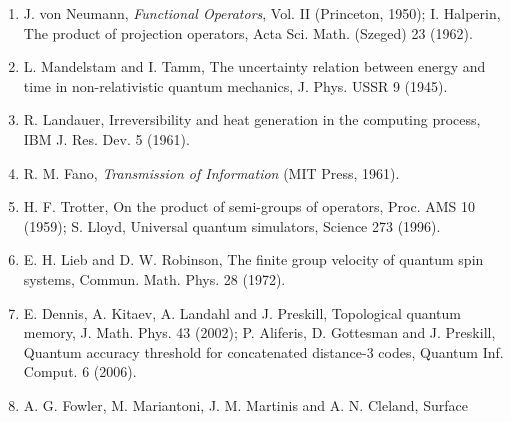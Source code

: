 \documentclass[
]{article}
\begin{document}
\begin{enumerate}
  answer in
  \texttt{B\allowbreak{}A\allowbreak{}N\allowbreak{}K\allowbreak{}S\allowbreak{}/\allowbreak{}2\allowbreak{}0\allowbreak{}2\allowbreak{}6\allowbreak{}-\allowbreak{}1\allowbreak{}0\allowbreak{}-\allowbreak{}2\allowbreak{}4\allowbreak{}-\allowbreak{}g\allowbreak{}l\allowbreak{}m\allowbreak{}-\allowbreak{}t\allowbreak{}h\allowbreak{}e\allowbreak{}r\allowbreak{}m\allowbreak{}o\allowbreak{}d\allowbreak{}y\allowbreak{}n\allowbreak{}a\allowbreak{}m\allowbreak{}i\allowbreak{}c\allowbreak{}-\allowbreak{}r\allowbreak{}o\allowbreak{}u\allowbreak{}t\allowbreak{}e\allowbreak{}/}.
  Their load-bearing arguments are incorporated in Part II and Section
  21 of this edition. The replayable four-stroke ledger is
  \texttt{L\allowbreak{}E\allowbreak{}D\allowbreak{}G\allowbreak{}E\allowbreak{}R\allowbreak{}-\allowbreak{}F\allowbreak{}O\allowbreak{}U\allowbreak{}R\allowbreak{}-\allowbreak{}S\allowbreak{}T\allowbreak{}R\allowbreak{}O\allowbreak{}K\allowbreak{}E\allowbreak{}-\allowbreak{}2\allowbreak{}0\allowbreak{}2\allowbreak{}6\allowbreak{}-\allowbreak{}1\allowbreak{}0\allowbreak{}-\allowbreak{}2\allowbreak{}4\allowbreak{}/},
  with chain heads printed in Chapter 1.
\item
  J. von Neumann, \emph{Functional Operators}, Vol. II (Princeton,
  1950); I. Halperin, The product of projection operators, Acta Sci.
  Math. (Szeged) 23 (1962).
\item
  L. Mandelstam and I. Tamm, The uncertainty relation between energy and
  time in non-relativistic quantum mechanics, J. Phys. USSR 9 (1945).
\item
  R. Landauer, Irreversibility and heat generation in the computing
  process, IBM J. Res. Dev. 5 (1961).
\item
  R. M. Fano, \emph{Transmission of Information} (MIT Press, 1961).
\item
  H. F. Trotter, On the product of semi-groups of operators, Proc. AMS
  10 (1959); S. Lloyd, Universal quantum simulators, Science 273 (1996).
\item
  E. H. Lieb and D. W. Robinson, The finite group velocity of quantum
  spin systems, Commun. Math. Phys. 28 (1972).
\item
  E. Dennis, A. Kitaev, A. Landahl and J. Preskill, Topological quantum
  memory, J. Math. Phys. 43 (2002); P. Aliferis, D. Gottesman and J.
  Preskill, Quantum accuracy threshold for concatenated distance-3
  codes, Quantum Inf. Comput. 6 (2006).
\item
  A. G. Fowler, M. Mariantoni, J. M. Martinis and A. N. Cleland, Surface

\end{enumerate}
\end{document}
